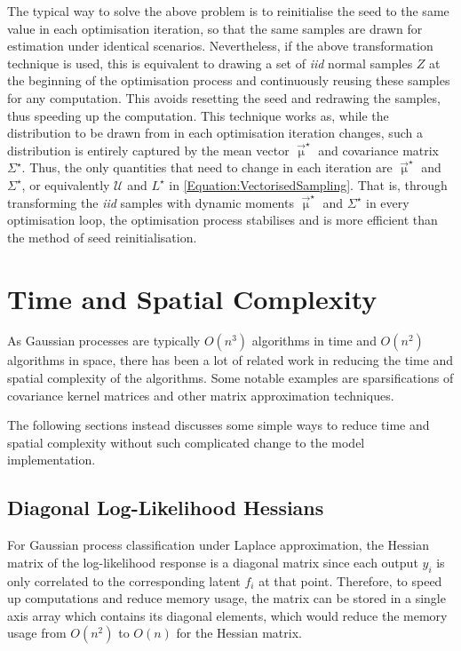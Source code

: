 			The typical way to solve the above problem is to reinitialise the seed to the same value in each optimisation iteration, so that the same samples are drawn for estimation under identical scenarios. Nevertheless, if the above transformation technique is used, this is equivalent to drawing a set of \textit{iid} normal samples $Z$ at the beginning of the optimisation process and continuously reusing these samples for any computation. This avoids resetting the seed and redrawing the samples, thus speeding up the computation. This technique works as, while the distribution to be drawn from in each optimisation iteration changes, such a distribution is entirely captured by the mean vector $\vec{\upmu}^{\star}$ and covariance matrix $\Sigma^{\star}$. Thus, the only quantities that need to change in each iteration are $\vec{\upmu}^{\star}$ and $\Sigma^{\star}$, or equivalently $\mathcal{U}$ and $L^{\star}$ in \eqref{Equation:VectorisedSampling}. That is, through transforming the \textit{iid} samples with dynamic moments $\vec{\upmu}^{\star}$ and $\Sigma^{\star}$ in every optimisation loop, the optimisation process stabilises and is more efficient than the method of seed reinitialisation.
			
	\newpage
	\section{Time and Spatial Complexity}
	\label{Appendix:ComputationalAspects:TimeComplexity}
	
		As Gaussian processes are typically $O(n^{3})$ algorithms in time and $O(n^{2})$ algorithms in space, there has been a lot of related work in reducing the time and spatial complexity of the algorithms. Some notable examples are sparsifications of covariance kernel matrices and other matrix approximation techniques.
		
		The following sections instead discusses some simple ways to reduce time and spatial complexity without such complicated change to the model implementation.
		
		\subsection{Diagonal Log-Likelihood Hessians}
		\label{Appendix:ComputationalAspects:TimeSpaceComplexity:DiagonalHessians}
					
			For Gaussian process classification under Laplace approximation, the Hessian matrix of the log-likelihood response is a diagonal matrix since each output $y_{i}$ is only correlated to the corresponding latent $f_{i}$ at that point. Therefore, to speed up computations and reduce memory usage, the matrix can be stored in a single axis array which contains its diagonal elements, which would reduce the memory usage from $O(n^{2})$ to $O(n)$ for the Hessian matrix.
			
